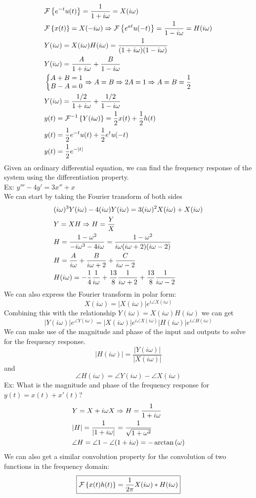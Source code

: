 \documentclass[11pt, fleqn]{article}
\begin{document}
\begin{align*}
    &\mathcal{F}\left\{ e^{-t}u(t) \right\}=\frac{1}{1+i\omega}=X(i\omega)\\
    &\mathcal{F}\left\{ x(t) \right\}=X(-i\omega)\Rightarrow \mathcal{F}\left\{ e^{at}u(-t) \right\}=\frac{1}{1-i\omega}=H(i\omega)\\
    &Y(i\omega)=X(i\omega)H(i\omega)=\frac{1}{(1+i\omega)(1-i\omega)}\\
    &Y(i\omega)=\frac{A}{1+i\omega}+\frac{B}{1-i\omega}\\
    &\left\{\begin{matrix} A+B=1\\ B-A=0 \end{matrix}\right.\Rightarrow A=B\Rightarrow 2A=1\Rightarrow A=B=\frac{1}{2}\\
    &Y(i\omega)=\frac{1/2}{1+i\omega}+\frac{1/2}{1-i\omega}\\
    &y(t)=\mathcal{F}^{-1}\left\{ Y(i\omega) \right\}=\frac{1}{2}x(t)+\frac{1}{2}h(t)\\
    &y(t)=\frac{1}{2}e^{-t}u(t)+\frac{1}{2}e^tu(-t)\\
    &y(t)=\frac{1}{2}e^{-|t|}
\end{align*}
Given an ordinary differential equation, we can find the frequency response of the system using the differentiation property.\\
Ex: $y'''-4y'=3x''+x$\\
We can start by taking the Fourier transform of both sides
\begin{align*}
    &(i\omega)^3Y(i\omega)-4(i\omega)Y(i\omega)=3(i\omega)^2X(i\omega)+X(i\omega)\\
    &Y=XH\Rightarrow H=\frac{Y}{X}\\
    &H=\frac{1-\omega^2}{-i\omega^3-4i\omega}=\frac{1-\omega^2}{i\omega(i\omega+2)(i\omega-2)}\\
    &H=\frac{A}{i\omega}+\frac{B}{i\omega+2}+\frac{C}{i\omega-2}\\
    &H(i\omega)=-\frac{1}{4}\frac{1}{i\omega}+\frac{13}{8}\frac{1}{i\omega+2}+\frac{13}{8}\frac{1}{i\omega-2}
\end{align*}
We can also express the Fourier transform in polar form:
$$X(i\omega)=|X(i\omega)|e^{i\angle X(i\omega)}$$
Combining this with the relationship $Y(i\omega)=X(i\omega)H(i\omega)$ we can get
\[ |Y(i\omega)|e^{\angle Y(i\omega)}=|X(i\omega)|e^{i\angle X(i\omega)}|H(i\omega)|e^{i\angle H(i\omega)} \]
We can make use of the magnitude and phase of the input and outputs to solve for the frequency response.
$$|H(i\omega)|=\frac{|Y(i\omega)|}{|X(i\omega)|}$$
and
$$\angle H(i\omega)=\angle Y(i\omega)-\angle X(i\omega)$$
Ex: What is the magnitude and phase of the frequency response for $y(t)=x(t)+x'(t)$?
\begin{align*}
    &Y=X+i\omega X\Rightarrow H=\frac{1}{1+i\omega}\\
    &|H|=\frac{1}{|1+i\omega|}=\frac{1}{\sqrt{1+\omega^2}}\\
    &\angle H=\angle 1-\angle(1+i\omega)=-\arctan\left( \omega \right)
\end{align*}
We can also get a similar convolution property for the convolution of two functions in the frequency domain:
$$\boxed{\mathcal{F}\left\{ x(t)h(t) \right\}=\frac{1}{2\pi}X(i\omega)*H(i\omega)}$$
\end{document}
